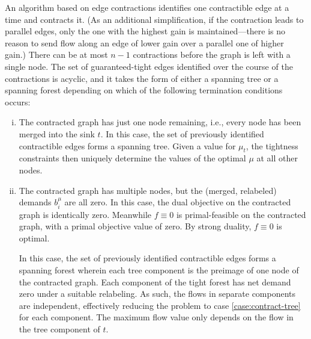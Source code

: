 \documentclass[11pt]{article}
\theoremstyle{definition}
\theoremstyle{definition}
\theoremstyle{definition}
\newcommand{\biu}{b_{i}^{\mu}}
\begin{document}
	An algorithm based on edge contractions identifies one contractible
	edge at a time and contracts it. 
    (As an additional simplification, if the contraction leads to parallel edges,
	only the one with the highest gain is maintained---there is no reason to send
	flow along an edge of lower gain over a parallel one of higher gain.)
	There can be at most $n - 1$ contractions
	before the graph is left with a single node. The set of guaranteed-tight edges identified
	over the course of the contractions is acyclic, and it takes the form of
	either a spanning tree or a spanning forest depending on which of the following
	termination conditions occurs:
	\begin{enumerate}[(i),itemsep=0mm]
	\item \label{case:contract-tree} The contracted graph has just one node remaining,
    i.e., every node has been merged
	into the sink $t$. In this case, the set of previously identified
	contractible edges forms a spanning tree. Given a value for $\mu_t$, the tightness
	constraints then uniquely determine the values of the optimal $\mu$ at all other nodes.
	
	\item The contracted graph has multiple nodes, but the (merged, relabeled)
	demands $\biu$ are all zero. In this case, the dual objective on the contracted
	graph is identically zero. Meanwhile $f \equiv 0$ is primal-feasible on the contracted
	graph, with a primal objective value of zero. By strong duality, $f \equiv 0$ is optimal.
	
	In this case, the set of previously identified contractible edges
	forms a spanning forest wherein each tree component is the preimage of one node
	of the contracted graph.
	Each component of the tight forest has net demand zero under a suitable relabeling.
	As such, the flows in separate components are independent, effectively reducing
	the problem to case \ref{case:contract-tree} for each component.
    The maximum flow value only depends on the flow in the
	tree component of $t$.
	\end{enumerate}
	
\end{document}
